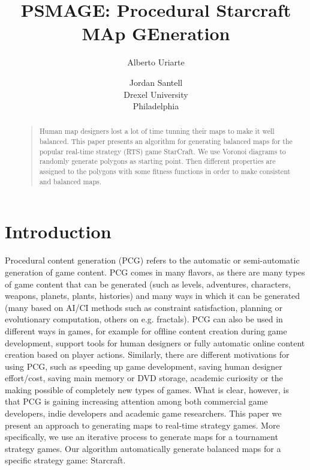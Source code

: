 \documentclass[letterpaper]{article}
\begin{document}
%
\title{PSMAGE: Procedural Starcraft MAp GEneration}
\author{Alberto Uriarte \and Jordan Santell\\
Drexel University\\
Philadelphia\\
}
\maketitle
\begin{abstract}
\begin{quote}
Human map designers lost a lot of time tunning their maps to make it well balanced. This paper presents an algorithm for generating balanced maps for the popular real-time strategy (RTS) game StarCraft. We use Voronoi diagrams to randomly generate polygons as starting point. Then different properties are assigned to the polygons with some fitness functions in order to make consistent and balanced maps.
\end{quote}
\end{abstract}


\section{Introduction} %
\label{sec:introduction}
Procedural content generation (PCG) refers to the automatic or semi-automatic generation of game content. PCG comes
in many ﬂavors, as there are many types of game content that can be generated (such as levels, adventures, characters,
weapons, planets, plants, histories) and many ways in which it can be generated (many based on AI/CI methods such as
constraint satisfaction, planning or evolutionary computation, others on e.g. fractals). PCG can also be used in different
ways in games, for example for ofﬂine content creation during game development, support tools for human designers or fully automatic online content creation based on player actions. Similarly, there are different motivations for using PCG, such as speeding up game development, saving human designer effort/cost, saving main memory or DVD storage, academic curiosity or the making possible of completely new types of games. What is clear, however, is that PCG is gaining increasing attention among both commercial game developers, indie developers and academic game researchers.
This paper we present an approach to generating maps to real-time strategy games. More speciﬁcally, we use an iterative process to generate maps for a tournament strategy games. Our algorithm automatically generate balanced maps for a specific strategy game: Starcraft.
\end{document}
